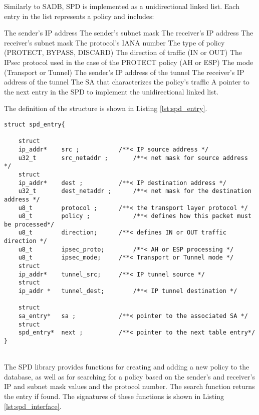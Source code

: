 Similarly to SADB, SPD is implemented as a unidirectional linked list. Each entry in the list represents a policy and includes:
\begin{outline}
    \1 The sender's IP address
    \1 The sender's subnet mask
    \1 The receiver's IP address
    \1 The receiver's subnet mask
    \1 The protocol's IANA number
    \1 The type of policy (PROTECT, BYPASS, DISCARD)
    \1 The direction of traffic (IN or OUT)
    \1 The IPsec protocol used in the case of the PROTECT policy (AH or ESP)
    \1 The mode (Transport or Tunnel)
    \1 The sender's IP address of the tunnel
    \1 The receiver's IP address of the tunnel
    \1 The SA that characterizes the policy's traffic
    \1 A pointer to the next entry in the SPD to implement the unidirectional linked list.
\end{outline}

\noindent
The definition of the structure is shown in Listing \ref{lst:spd_entry}.\\

\noindent
\begin{minipage}{\linewidth}
\begin{lstlisting}[style=mycodestyle, label={lst:spd_entry}, caption={The SPD entry strucutre}]
struct spd_entry{

	struct 
	ip_addr*	src ;			/**< IP source address */
	u32_t  		src_netaddr ;		/**< net mask for source address */
	struct 
	ip_addr*	dest ;			/**< IP destination address */
	u32_t		dest_netaddr ;		/**< net mask for the destination address */
	u8_t		protocol ;		/**< the transport layer protocol */
	u8_t		policy ;			/**< defines how this packet must be processed*/
	u8_t		direction;		/**< defines IN or OUT traffic direction */
	u8_t		ipsec_proto;		/**< AH or ESP processing */
	u8_t		ipsec_mode;		/**< Transport or Tunnel mode */
	struct 
	ip_addr*	tunnel_src;		/**< IP tunnel source */
	struct 
	ip_addr *	tunnel_dest;		/**< IP tunnel destination */
	
	struct
	sa_entry*	sa ;			/**< pointer to the associated SA */
	struct
	spd_entry*	next ;			/**< pointer to the next table entry*/
}
\end{lstlisting}
\end{minipage}\\

The SPD library provides functions for creating and adding a new policy to the database, as well as for searching for a policy based on the sender's and receiver's IP and subnet mask values and the protocol number. The search function returns the entry if found. The signatures of these functions is shown in Listing \ref{lst:spd_interface}.\\

